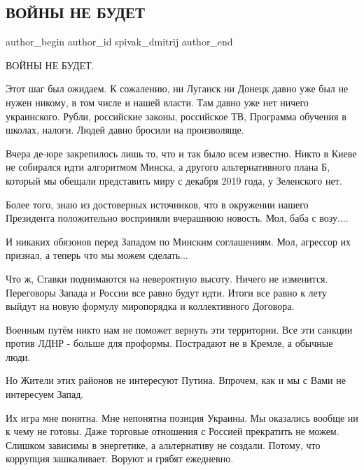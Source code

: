  
 
 
 
 
 
\subsection{ВОЙНЫ НЕ БУДЕТ}
\label{sec:22_02_2022.fb.spivak_dmitrij.1.vojny_ne_budet}
 
\ifcmt
 author_begin
   author_id spivak_dmitrij
 author_end
\fi

ВОЙНЫ НЕ БУДЕТ. 

Этот шаг был ожидаем. К сожалению, ни Луганск ни Донецк давно уже был не нужен
никому, в том числе и  нашей власти. Там давно уже нет ничего украинского.
Рубли, российские законы, российское ТВ, Программа обучения  в школах, налоги.
Людей давно бросили на произволяще. 

Вчера де-юре закрепилось лишь то, что и так было всем известно. Никто в Киеве
не собирался идти алгоритмом Минска, а другого альтернативного плана Б, который
мы обещали представить миру с декабря 2019 года,  у Зеленского нет. 

Более того, знаю из достоверных источников, что в окружении нашего Президента
положительно восприняли вчерашнюю новость. Мол, баба с возу.... 

И никаких обязонов перед Западом по Минским соглашениям. Мол, агрессор их
признал, а теперь что мы можем сделать... 

Что ж, Ставки поднимаются на невероятную высоту. Ничего не изменится.
Переговоры Запада и России все равно будут идти. Итоги все равно к лету выйдут
на новую формулу миропорядка и коллективного Договора.  

Военным путём никто нам не поможет вернуть эти территории. Все эти санкции
против ЛДНР - больше для проформы. Пострадают не в Кремле, а обычные люди. 

Но Жители этих районов не интересуют Путина. Впрочем, как и мы с Вами не
интересуем Запад. 

Их игра мне понятна. Мне непонятна позиция Украины. Мы оказались вообще ни к
чему не готовы. Даже торговые отношения с Россией прекратить не можем. Слишком
зависимы в энергетике, а альтернативу не создали. Потому, что коррупция
зашкаливает. Воруют и грябят ежедневно. 

